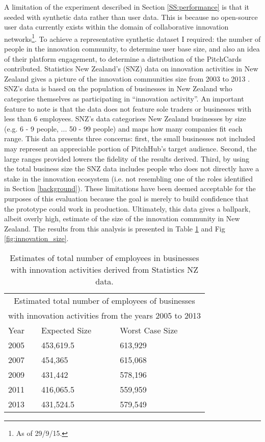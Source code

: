 A limitation of the experiment described in Section \ref{SS:performance} is that it seeded with synthetic data rather than user data. This is because no open-source user data currently exists within the domain of collaborative innovation networks\footnote{As of 29/9/15.}. To achieve a representative synthetic dataset I required: the number of people in the innovation community, to determine user base size, and also an idea of their platform engagement, to determine a distribution of the PitchCards contributed. Statistics New Zealand's (SNZ) data on innovation activities in New Zealand gives a picture of the innovation communities size from 2003 to 2013 \cite{Innov5:online}. 
SNZ's data is based on the population of businesses in New Zealand who categorise themselves as participating in ``innovation activity''. An important feature to note is that the data does not feature sole traders or businesses with less than 6 employees. SNZ's data categorises New Zealand businesses by size (e.g. 6 - 9 people, ... 50 - 99 people) and maps how many companies fit each range. 
This data presents three concerns: first, the small businesses not included may represent an appreciable portion of PitchHub's target audience. Second, the large ranges provided lowers the fidelity of the results derived. Third, by using the total business size the SNZ data includes people who does not directly have a stake in the innovation ecosystem (i.e. not resembling one of the roles identified in Section \ref{background}). These limitations have been deemed acceptable for the purposes of this evaluation because the goal is merely to build confidence that the prototype could work in production. Ultimately, this data gives a ballpark, albeit overly high, estimate of the size of the innovation community in New Zealand. The results from this analysis is presented in Table \ref{tab:title} and Fig \ref{fig:innovation_size}.

\begin {table}[H]
\begin{center}
\begin{tabular}{ |p{2cm}||p{3cm}|p{3cm}|  }
 \hline
 \multicolumn{3}{|c|}{Estimated total number of employees of businesses}\\
 \multicolumn{3}{|c|}{with innovation activities from the years 2005 to 2013} \\
 \hline
 Year & Expected Size & Worst Case Size\\
 \hline
    2005 & 453,619.5 & 613,929\\
 \hline
    2007 & 454,365 & 615,068\\
 \hline
    2009 & 431,442 & 578,196\\
 \hline
    2011 & 416,065.5 & 559,959\\
 \hline
    2013 & 431,524.5 & 579,549\\
 \hline
\end{tabular}
\end{center}
\caption {Estimates of total number of employees in businesses with innovation activities derived from Statistics NZ data.} \label{tab:title} 
\end {table}

